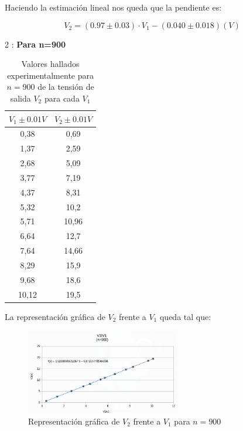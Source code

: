 \documentclass[11pt,letterpaper,twocolumn]{article}
\begin{document}
Haciendo la estimación lineal nos queda que la pendiente es:

\begin{equation}
	\boxed{V_2={\left( 0.97\pm 0.03 \right)\cdot V_1 - \left( 0.040 \pm 0.018 \right)} (V)  }
\end{equation}



\item[2]: \textbf{Para n=900}
		\begin{table}[H]
			\centering
			\caption{Valores hallados experimentalmente para $n=900$ de la tensión de salida $V_2$ para cada $V_1$}
			\begin{tabular}{|c|c|}
				\hline
				\multicolumn{1}{|l|}{$V_1 \pm 0.01 V$} & \multicolumn{1}{l|}{$V_2 \pm 0.01 V$} \\ \hline
				0,38 & 0,69 \\ 
				1,37 & 2,59 \\ 
				2,68 & 5,09 \\
				3,77 & 7,19 \\
				4,37 & 8,31 \\
				5,32 & 10,2 \\
				5,71 & 10,96 \\
				6,64 & 12,7 \\
				7,64 & 14,66 \\ 
				8,29 & 15,9 \\ 
				9,68 & 18,6 \\ 
				10,12 & 19,5 \\ \hline
			\end{tabular}
			\label{}
		\end{table}

			La representación gráfica de $V_2$ frente a $V_1$ queda tal que:

		\begin{figure}[H]
			\centering
			\includegraphics[width=0.6\textwidth]{v900.png}
			\caption{Representación gráfica de $V_2$ frente a $V_1$ para $n=900$}
			\label{fig:v900-png}
		\end{figure}
\end{document}

